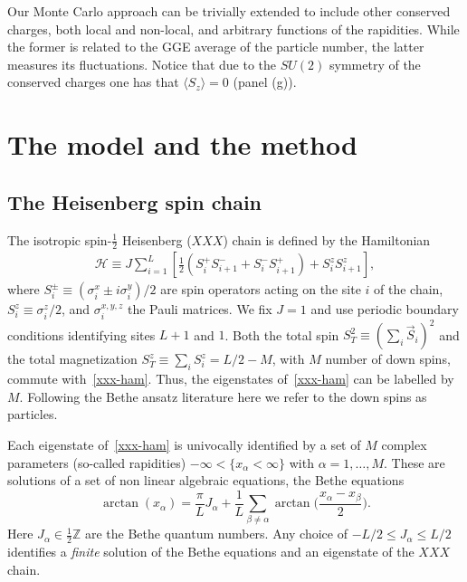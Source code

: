 \documentclass[twocolumn,superscriptaddress,prb,10pt]{revtex4-1}
\begin{document}
Our Monte Carlo approach can be trivially extended to include other conserved 
charges, both local and non-local, and arbitrary functions of the rapidities. 
While the former is related to the GGE average of the particle number, the 
latter measures its fluctuations. Notice that due to the $SU(2)$ symmetry 
of the conserved charges one has that $\langle S_z\rangle=0$ (panel (g)). 




\section{The model and the method}


\subsection{The Heisenberg spin chain}

The isotropic spin-$\frac{1}{2}$ Heisenberg ($XXX$) chain is defined by the 
Hamiltonian 
%
\begin{align}
\label{xxx-ham}
{\mathcal H}\equiv J\sum\limits_{i=1}^L\left[\frac{1}{2}(S_i^+S^-_{i+1} 
+S_i^{-}S_{i+1}^+)+S_i^zS_{i+1}^z\right],  
\end{align}
%
where $S^{\pm}_i\equiv (\sigma_i^x\pm i\sigma_i^y)/2$ are spin operators 
acting on the site $i$ of the chain, $S_i^z\equiv\sigma_i^z/2$, and 
$\sigma^{x,y,z}_i$ the Pauli matrices. We fix $J=1$ and use periodic 
boundary conditions identifying sites $L+1$ and $1$. Both the total spin 
$S_T^2\equiv(\sum_i \vec S_i)^2$ and the total magnetization $S_{T}^z\equiv
\sum_iS_i^z=L/2-M$, with $M$ number of down spins, commute with~\eqref{xxx-ham}. 
Thus, the eigenstates of~\eqref{xxx-ham} can be labelled by $M$. Following 
the Bethe ansatz literature here we refer to the down spins as particles. 

Each eigenstate of~\eqref{xxx-ham} is univocally identified by a set of $M$ 
complex parameters (so-called rapidities) $-\infty<\{x_\alpha<\infty\}$ with 
$\alpha=1,\dots,M$. These are solutions of a set of non linear algebraic 
equations, the Bethe equations
%
\begin{equation}
\arctan(x_\alpha)=\frac{\pi}{L}J_\alpha+
\frac{1}{L}\sum\limits_{\beta\ne \alpha}\arctan\Big(\frac{
x_\alpha-x_\beta}{2}\Big).   
\label{ba-eq}
\end{equation}
%
Here $J_\alpha\in\frac{1}{2}\mathbb{Z}$ are the Bethe quantum numbers. 
Any choice of $-L/2\le J_\alpha\le L/2$ identifies a {\it finite} 
solution of the Bethe equations and an eigenstate of the $XXX$ chain. 
\end{document}
